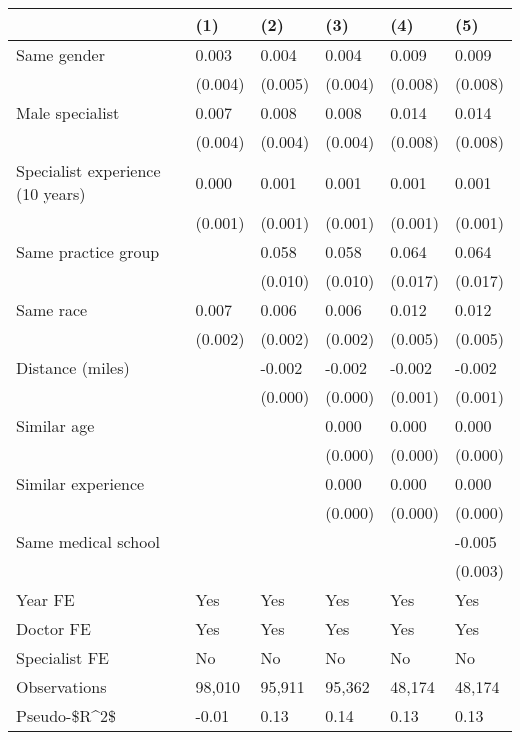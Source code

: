 \begin{tabular}{llllll}
\hline
& (1) & (2) & (3) & (4) & (5) \\ \hline
Same gender                        & 0.003   & 0.004   & 0.004   & 0.009   & 0.009   \\
& (0.004) & (0.005) & (0.004) & (0.008) & (0.008) \\
Male specialist                    & 0.007   & 0.008   & 0.008   & 0.014   & 0.014   \\
& (0.004) & (0.004) & (0.004) & (0.008) & (0.008) \\
Specialist experience (10 years)   & 0.000   & 0.001   & 0.001   & 0.001   & 0.001   \\
& (0.001) & (0.001) & (0.001) & (0.001) & (0.001) \\
Same practice group                &         & 0.058   & 0.058   & 0.064   & 0.064   \\
&         & (0.010) & (0.010) & (0.017) & (0.017) \\
Same race                          & 0.007   & 0.006   & 0.006   & 0.012   & 0.012   \\
& (0.002) & (0.002) & (0.002) & (0.005) & (0.005) \\
Distance (miles)                   &         & -0.002  & -0.002  & -0.002  & -0.002  \\
&         & (0.000) & (0.000) & (0.001) & (0.001) \\
Similar age                        &         &         & 0.000   & 0.000   & 0.000   \\
&         &         & (0.000) & (0.000) & (0.000) \\
Similar experience                 &         &         & 0.000   & 0.000   & 0.000   \\
&         &         & (0.000) & (0.000) & (0.000) \\
Same medical school                &         &         &         &         & -0.005  \\
&         &         &         &         & (0.003) \\
Year FE                            & Yes     & Yes     & Yes     & Yes     & Yes     \\
Doctor FE                          & Yes     & Yes     & Yes     & Yes     & Yes     \\
Specialist FE                      & No      & No      & No      & No      & No      \\
Observations                       & 98,010  & 95,911  & 95,362  & 48,174  & 48,174  \\
Pseudo-\$R\textasciicircum{}2\$ & -0.01   & 0.13    & 0.14    & 0.13    & 0.13    \\
\hline
\end{tabular}
